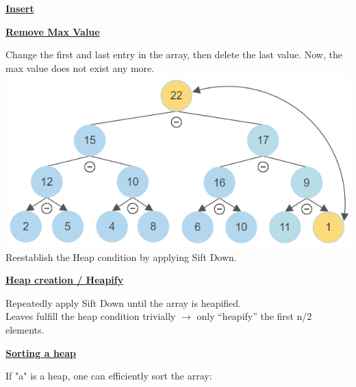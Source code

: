     {\centering\underline{\textbf{Insert}} \par}
        

    {\centering\underline{\textbf{Remove Max Value}} \par}
        Change the first and last entry in the array, then delete the last value. Now, the max value does not exist any more.
        \includegraphics[width = \linewidth]{src/4_data_structure/images/heap_remove_max.png}
        Reestablish the Heap condition by applying Sift Down.
        

    {\centering\underline{\textbf{Heap creation / Heapify}} \par}
        Repeatedly apply Sift Down until the array is heapified.\\
        Leaves fulfill the heap condition trivially $\rightarrow$ only “heapify” the first n/2 elements.
        

    {\centering\underline{\textbf{Sorting a heap}} \par}
        If "a" is a heap, one can efficiently sort the array:
        
    
